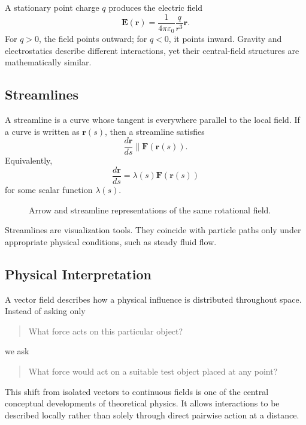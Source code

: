 A stationary point charge $q$ produces the electric field
\[
\boxed{
\mathbf E(\mathbf r)
=
\frac{1}{4\pi\varepsilon_0}
\frac{q}{r^3}\mathbf r.
}
\]
For $q>0$, the field points outward; for $q<0$, it points inward. Gravity and
electrostatics describe different interactions, yet their central-field
structures are mathematically similar.

\subsection{Streamlines}

A streamline is a curve whose tangent is everywhere parallel to the local field.
If a curve is written as $\mathbf r(s)$, then a streamline satisfies
\[
\frac{d\mathbf r}{ds}\parallel\mathbf F(\mathbf r(s)).
\]
Equivalently,
\[
\frac{d\mathbf r}{ds}
=
\lambda(s)\mathbf F(\mathbf r(s))
\]
for some scalar function $\lambda(s)$.

\begin{figure}[htbp]
\centering
\begingroup
{}

\endgroup
\caption{Arrow and streamline representations of the same rotational field.}
\label{fig:arrows-and-streamlines}
\end{figure}

Streamlines are visualization tools. They coincide with particle paths only
under appropriate physical conditions, such as steady fluid flow.

\subsection{Physical Interpretation}

A vector field describes how a physical influence is distributed throughout
space. Instead of asking only
\begin{quote}
What force acts on this particular object?
\end{quote}
we ask
\begin{quote}
What force would act on a suitable test object placed at any point?
\end{quote}

This shift from isolated vectors to continuous fields is one of the central
conceptual developments of theoretical physics. It allows interactions to be
described locally rather than solely through direct pairwise action at a
distance.

